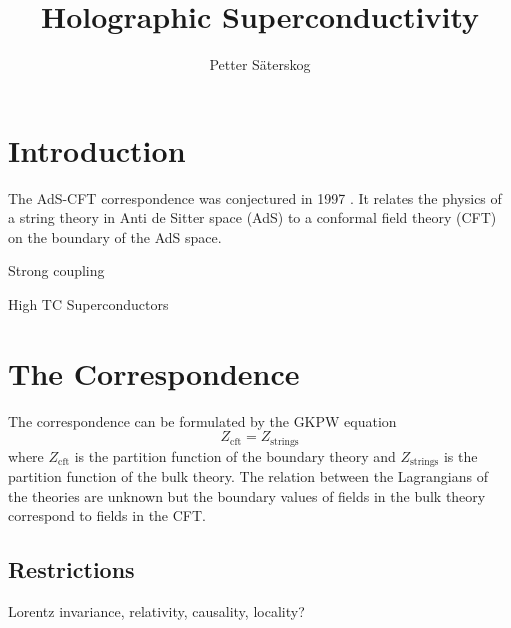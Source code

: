 \documentclass[12pt]{article}
\title{Holographic Superconductivity}
\author{Petter Säterskog}
\begin{document}
\maketitle
\tableofcontents

\section{Introduction}
The AdS-CFT correspondence was conjectured in 1997 \cite{Maldacena:1997re}. It relates the physics of a string theory in Anti de Sitter space (AdS) to a conformal field theory (CFT) on the boundary of the AdS space.

Strong coupling

High TC Superconductors
\section{The Correspondence}
The correspondence can be formulated by the GKPW equation \cite{Witten:1998qj}
\begin{equation}
 Z_{\text{cft}}=Z_{\text{strings}}
\label{GKPW}
\end{equation}
where $Z_{\text{cft}}$ is the partition function of the boundary theory and $Z_{\text{strings}}$ is the partition function of the bulk theory. The relation between the Lagrangians of the theories are unknown but the boundary values of fields in the bulk theory correspond to fields in the CFT.
\subsection{Restrictions}
Lorentz invariance, relativity, causality, locality?
\end{document}
